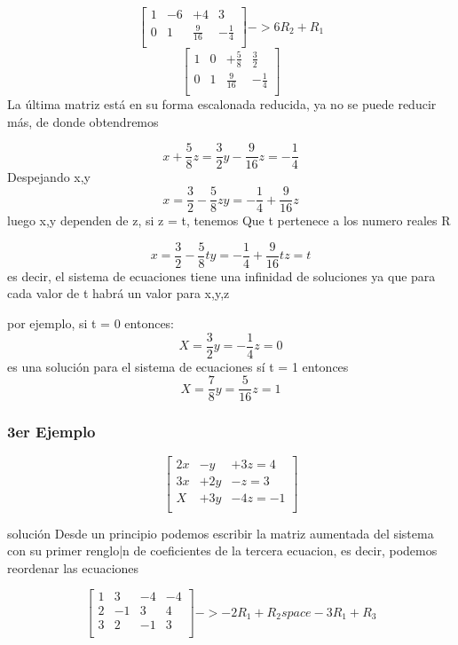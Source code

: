 \documentclass{article}
\begin{document}
\[
\begin{bmatrix}
 1 & -6 & + 4 & 3  \\
 0 & 1 & \frac{9}{16} & -\frac{1}{4}  \\
\end{bmatrix}
-> 6R_2+R_1
\]
\[
\begin{bmatrix}
 1 & 0 & + \frac{5}{8} & \frac{3}{2}  \\
 0 & 1 & \frac{9}{16} & -\frac{1}{4}  \\
\end{bmatrix}
\]
La última matriz está en su forma escalonada reducida, ya no se puede reducir más,
de donde obtendremos

\[
    x + \frac{5}{8}z = \frac{3}{2}
    y - \frac{9}{16}z = -\frac{1}{4}
\]
Despejando x,y
\[
    x  =  \frac{3}{2} -\frac{5}{8}z
    y = -\frac{1}{4} + \frac{9}{16}z
\]
luego x,y dependen de z, si z = t, tenemos Que t pertenece a los numero reales R

\[
    x  =  \frac{3}{2} -\frac{5}{8}t
    y = -\frac{1}{4} + \frac{9}{16}t
    z = t
\]
es decir, el sistema de ecuaciones tiene una infinidad de soluciones ya que para cada valor
de t habrá un valor para x,y,z


por ejemplo, si t = 0 entonces:
\[
X = \frac{3}{2}
y = -\frac{1}{4}
z = 0
\]
es una solución para el sistema de ecuaciones
sí t = 1 entonces
\[
X = \frac{7}{8}
y = \frac{5}{16}
z = 1
\]

\subsubsection{3er Ejemplo}


\[
\begin{bmatrix}
 2x & -y & + 3z = 4  \\
 3x & +2y & -z = 3  \\
 X & +3y & -4z = -1  \\
\end{bmatrix}
\]

solución
Desde un principio podemos escribir la matriz aumentada del sistema con su primer
renglo|n de coeficientes de la tercera ecuacion, es decir, podemos reordenar las ecuaciones

\[
\begin{bmatrix}
 1 & 3 & -4 & -4  \\
 2 & -1 & 3 & 4  \\
 3 & 2 & -1 & 3  \\
\end{bmatrix}
-> -2R_1+ R_2 space  -3R_1+R_3
\]
\end{document}
